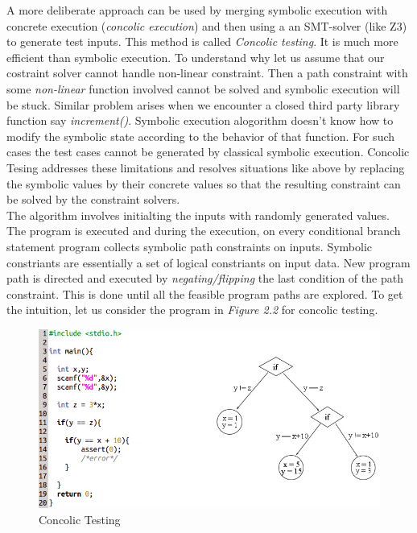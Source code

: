 \documentclass[12pt,oneside]{book}
\begin{document}
A more deliberate approach can be used by merging symbolic execution with concrete execution (\textit{concolic execution}) and then using a an SMT-solver (like Z3\cite{z3}) to generate test inputs. This method is called \textit{Concolic testing}. It is much more efficient than symbolic execution. To understand why let us assume that our costraint solver cannot handle non-linear constraint. Then a path constraint with some \textit{non-linear} function involved cannot be solved and symbolic execution will be stuck. Similar problem arises when we encounter a closed third party library function say \textit{increment()}. Symbolic execution alogorithm doesn't know how to modify the symbolic state according to the behavior of that function. For such cases the test cases cannot be generated by classical symbolic execution\cite{decadeslater}. Concolic Tesing addresses these limitations and resolves situations like above by replacing the symbolic values by their concrete values so that the resulting constraint can be solved by the constraint solvers.\\

The algorithm involves initialting the inputs with randomly generated values. The program is executed and during the execution, on every conditional branch statement program collects symbolic path constraints on inputs. Symbolic constriants are essentially a set of logical constriants on input data. New program path is directed and executed by \textit{negating/flipping} the last condition of the path constraint. This is done until all the feasible program paths are explored. To get the intuition, let us consider the program in \textit{Figure 2.2} for concolic testing.  

\newpage

\begin{figure}[htbp]
\centering
\includegraphics[scale=0.5]{conjoined4.png}
\caption{Concolic Testing}
\end{figure}
\end{document}
